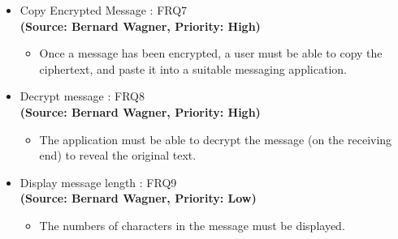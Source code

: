 \begin{itemize}
\begin{itemize}
\end{itemize}
\item{Copy Encrypted Message : FRQ7}\\
\textbf{(Source: Bernard Wagner, Priority: High)}
\begin{itemize}
\item Once a message has been encrypted, a user must be able to copy the ciphertext, and paste it into a suitable messaging application.
\end{itemize}
\item{Decrypt message : FRQ8}\\
\textbf{(Source: Bernard Wagner, Priority: High)}
\begin{itemize}
\item The application must be able to decrypt the message (on the receiving end) to reveal the original text.
\end{itemize}
\item{Display message length : FRQ9}\\
\textbf{(Source: Bernard Wagner, Priority: Low)}
\begin{itemize}
\item The numbers of characters in the message must be displayed.
\end{itemize}
\end{itemize}

